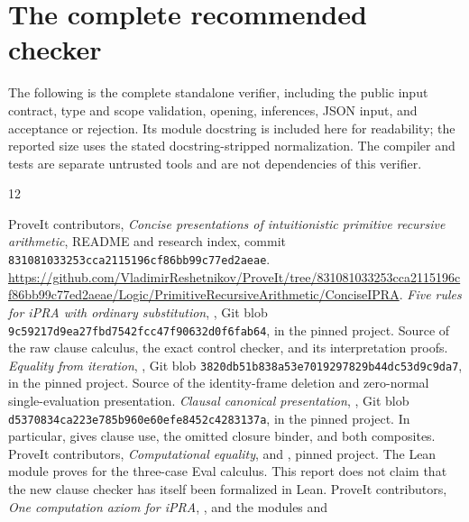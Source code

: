 \clearpage
\section{The complete recommended checker}
\label{app:complete-checker}
The following is the complete standalone verifier, including the
public input contract, type and scope validation, opening,
inferences, JSON input, and acceptance or rejection. Its module
docstring is included here for readability; the reported size
uses the stated docstring-stripped normalization. The compiler
and tests are separate untrusted tools and are not dependencies
of this verifier.


\clearpage
\begin{thebibliography}{12}
\small\raggedright
{}
ProveIt contributors, \emph{Concise presentations of intuitionistic
primitive recursive arithmetic}, README and research index,
commit \texttt{831081033253cca2115196cf86bb99c77ed2aeae}.
\url{https://github.com/VladimirReshetnikov/ProveIt/tree/831081033253cca2115196cf86bb99c77ed2aeae/Logic/PrimitiveRecursiveArithmetic/ConciseIPRA}.
\emph{Five rules for iPRA with ordinary substitution},
,
Git blob \texttt{9c59217d9ea27fbd7542fcc47f90632d0f6fab64},
in the pinned project. Source of the raw clause calculus,
the exact control checker, and its interpretation proofs.
\emph{Equality from iteration},
,
Git blob \texttt{3820db51b838a53e7019297829b44dc53d9c9da7},
in the pinned project. Source of the identity-frame deletion
and zero-normal single-evaluation presentation.
\emph{Clausal canonical presentation},
,
Git blob \texttt{d5370834ca223e785b960e60efe8452c4283137a},
in the pinned project. In particular, 
gives clause use, the omitted closure binder, and both composites.
ProveIt contributors, \emph{Computational equality},
 and
, pinned project.
The Lean module proves  for the three-case
Eval calculus. This report does not claim that the new clause
checker has itself been formalized in Lean.
ProveIt contributors, \emph{One computation axiom for iPRA},
, and the modules
 and

\end{thebibliography}
